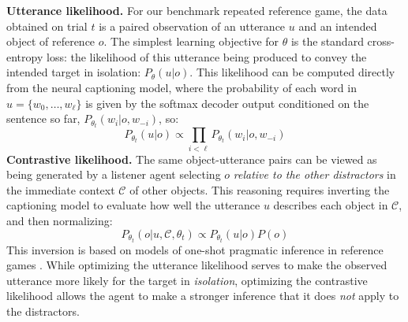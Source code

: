 \documentclass[11pt,a4paper]{article}
\newcommand{\prg}[1]{\noindent\textbf{#1}} %
\begin{document}
\prg{Utterance likelihood.} 
For our benchmark repeated reference game, the data obtained on trial $t$ is a paired observation of an utterance $u$ and an intended object of reference $o$. %
The simplest learning objective for $\theta$ is the standard cross-entropy loss: the likelihood of this utterance being produced to convey the intended target in isolation: $P_\theta(u | o)$.
This likelihood can be computed directly from the neural captioning model, where the probability of each word in $u=\{w_0, \dots, w_\ell\}$ is given by the softmax decoder output conditioned on the sentence so far, $P_{\theta_t}(w_i |o, w_{-i})$, so:
\begin{equation}
	P_{\theta_t}(u | o) \propto \prod_{i<\ell} P_{\theta_t}(w_i |o, w_{-i})
	\label{eq:speaker}
\end{equation}
\prg{Contrastive likelihood.} 
The same object-utterance pairs can be viewed as being generated by a listener agent selecting $o$ \emph{relative to the other distractors} in the immediate context $\mathcal{C}$ of other objects.
This reasoning requires inverting the captioning model to evaluate how well the utterance $u$ describes each object in $\mathcal{C}$, and then normalizing:
\begin{equation}
 P_{\theta_t}(o | u, \mathcal{C}, \theta_t) \propto 
   P_{\theta_t}(u | o)P(o) %
	\label{eq:listener}
\end{equation}
This inversion is based on models of one-shot pragmatic inference in reference games   \cite{GoodmanFrank16_RSATiCS,andreas2016reasoning,VedantamEtAl17_ContextAwareCaptions,cohn2018pragmatically}.
While optimizing the utterance likelihood serves to make the observed utterance more likely for the target in \emph{isolation}, optimizing the contrastive likelihood allows the agent to make a stronger inference that it does \emph{not} apply to the distractors.%
\end{document}
